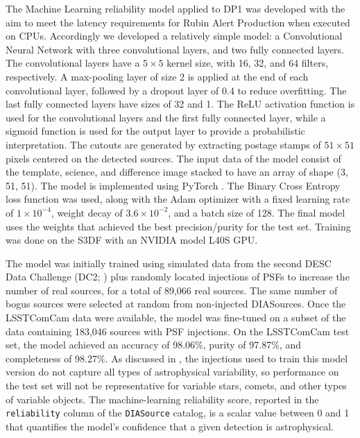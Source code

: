 The Machine Learning reliability model applied to \gls{DP1} was developed with the aim to meet the latency requirements for Rubin \gls{Alert Production} when executed on CPUs.
Accordingly we developed a relatively simple model: a Convolutional Neural Network with three convolutional layers, and two fully connected layers.
The convolutional layers have a $5\times5$ kernel size, with 16, 32, and 64 filters, respectively.
A max-pooling layer of size 2 is applied at the end of each convolutional layer, followed by a dropout layer of 0.4 to reduce overfitting.
The last fully connected layers have sizes of 32 and 1.
The ReLU activation function is used for the convolutional layers and the first fully connected layer, while a sigmoid function is used for the output layer to provide a probabilistic interpretation.
The cutouts are generated by extracting postage stamps of $51\times51$ pixels centered on the detected sources.
The input data of the model consist of the template, science, and difference image stacked to have an array of \gls{shape} (3, 51, 51).
The model is implemented using PyTorch \citep{10.1145/3620665.3640366}.
The Binary Cross Entropy loss function was used, along with the \gls{Adam} optimizer with a fixed learning rate of $1\times10^{-4}$, weight decay of $3.6\times10^{-2}$, and a batch size of 128.
The final model uses the weights that achieved the best precision/purity for the test set.
Training was done on the \gls{S3DF} with an NVIDIA model L40S GPU.

The model was initially trained using simulated data from the second DESC Data Challenge (DC2; \citep{2021ApJS..253...31L}) plus randomly located injections of PSFs to increase the number of real sources, for a total of 89,066 real sources.
The same number of bogus sources were selected at random from non-injected DIASources.
Once the  \gls{LSSTComCam} data were available, the model was fine-tuned on a subset of the data containing 183,046 sources with PSF injections.
On the \gls{LSSTComCam} test set, the model achieved an accuracy of 98.06\%, purity of 97.87\%, and completeness of 98.27\%.
As discussed in , the injections used to train this model version do not capture all types of astrophysical variability, so performance on the test set will not be representative for variable stars, comets, and other types of variable objects.
The machine-learning reliability score, reported in the \texttt{reliability} column of the \texttt{DIASource} catalog, is a scalar value between 0 and 1 that quantifies the model’s confidence that a given detection is astrophysical.

